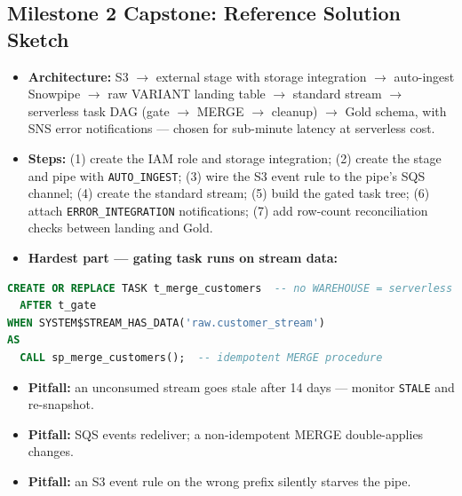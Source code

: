 \documentclass[11pt, a4paper]{article}
\begin{document}
\subsection*{Milestone 2 Capstone: Reference Solution Sketch}
\begin{itemize}[label=-, nosep]
    \item \textbf{Architecture:} S3 $\rightarrow$ external stage with storage integration $\rightarrow$ auto-ingest Snowpipe $\rightarrow$ raw VARIANT landing table $\rightarrow$ standard stream $\rightarrow$ serverless task DAG (gate $\rightarrow$ MERGE $\rightarrow$ cleanup) $\rightarrow$ Gold schema, with SNS error notifications --- chosen for sub-minute latency at serverless cost.
    \item \textbf{Steps:} (1) create the IAM role and storage integration; (2) create the stage and pipe with \texttt{AUTO\_INGEST}; (3) wire the S3 event rule to the pipe's SQS channel; (4) create the standard stream; (5) build the gated task tree; (6) attach \texttt{ERROR\_INTEGRATION} notifications; (7) add row-count reconciliation checks between landing and Gold.
    \item \textbf{Hardest part --- gating task runs on stream data:}
\end{itemize}
\begin{lstlisting}[language=SQL, caption={Serverless task gated on the stream offset}]
CREATE OR REPLACE TASK t_merge_customers  -- no WAREHOUSE = serverless
  AFTER t_gate
WHEN SYSTEM$STREAM_HAS_DATA('raw.customer_stream')
AS
  CALL sp_merge_customers();  -- idempotent MERGE procedure
\end{lstlisting}
\begin{itemize}[label=-, nosep]
    \item \textbf{Pitfall:} an unconsumed stream goes stale after 14 days --- monitor \texttt{STALE} and re-snapshot.
    \item \textbf{Pitfall:} SQS events redeliver; a non-idempotent MERGE double-applies changes.
    \item \textbf{Pitfall:} an S3 event rule on the wrong prefix silently starves the pipe.
\end{itemize}
\end{document}
